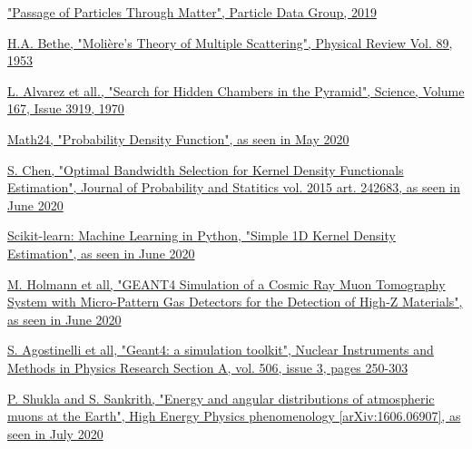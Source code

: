 \documentclass[a4paper, 11pt]{report}
\begin{document}
\begin{thebibliography}{1}
\href{http://pdg.lbl.gov/2019/reviews/rpp2019-rev-passage-particles-matter.pdf}{
"Passage of Particles Through Matter", Particle Data Group, 2019}

\href{https://journals.aps.org/pr/abstract/10.1103/PhysRev.89.1256}{H.A. Bethe,
"Moli\`ere's Theory of Multiple Scattering", 
Physical Review Vol. 89, 1953}

\href{https://ui.adsabs.harvard.edu/abs/1970Sci...167..832A/abstract}{L. Alvarez et all.,
"Search for Hidden Chambers in the Pyramid", 
Science, Volume 167, Issue 3919, 1970}

\href{https://www.math24.net/probability-density-function/}{Math24, "Probability Density Function", as seen in May 2020}

\href{https://www.hindawi.com/journals/jps/2015/242683/}{S. Chen, "Optimal Bandwidth Selection for Kernel Density Functionals Estimation", Journal of Probability and Statitics vol. 2015 art. 242683, as seen in June 2020}

\href{https://scikit-learn.org/stable/auto_examples/neighbors/plot_kde_1d.html}{Scikit-learn: Machine Learning in {P}ython, "Simple 1D Kernel Density Estimation", as seen in June 2020}

\href{https://arxiv.org/pdf/0811.0187.pdf}{M. Holmann et all, "GEANT4 Simulation of a Cosmic Ray Muon Tomography System with Micro-Pattern Gas Detectors for the Detection of High-Z Materials", as seen in June 2020}

\href{https://www.sciencedirect.com/science/article/pii/S0168900203013688}{S. Agostinelli et all, "Geant4: a simulation toolkit", Nuclear Instruments and Methods in Physics Research Section A, vol. 506, issue 3, pages 250-303}

\href{https://arxiv.org/abs/1606.06907}{P. Shukla and S. Sankrith, "Energy and angular distributions of atmospheric muons at the Earth", High Energy Physics phenomenology [arXiv:1606.06907], as seen in July 2020}

\end{thebibliography}
\end{document}
